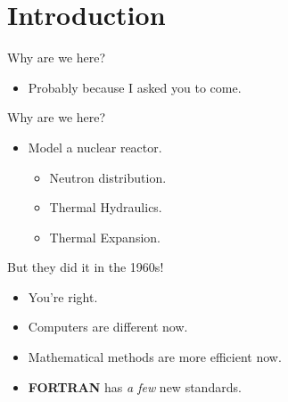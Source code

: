 \section{Introduction}
\label{sec:introduction}

\begin{frame}{Why are we here?}
  \pause
  \begin{itemize}
    \item Probably because I asked you to come.
  \end{itemize}
\end{frame}

\begin{frame}{Why are we here?}
  \begin{itemize}
    \item {\huge Model a nuclear reactor.}
      \pause
      \begin{itemize}
        \item Neutron distribution.
        \item Thermal Hydraulics.
        \item Thermal Expansion.
      \end{itemize}
  \end{itemize}
\end{frame}

\begin{frame}{But they did it in the 1960s!}
  \begin{itemize}
    \item You're right.
    \item Computers are different now.
    \item Mathematical methods are more efficient now.
    \item \textbf{FORTRAN} has \textit{a few} new standards.
  \end{itemize}
\end{frame}

